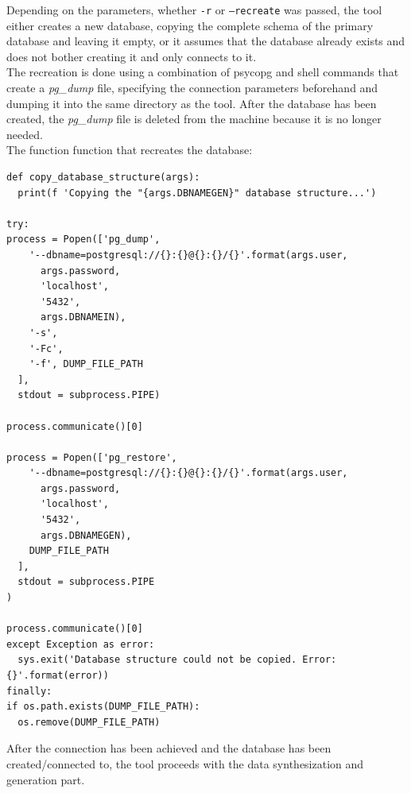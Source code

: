 Depending on the parameters, whether \texttt{-r} or \texttt{--recreate} was passed, the tool either creates a new database, copying the complete schema of the primary database and leaving it empty, or it assumes that the database already exists and does not bother creating it and only connects to it.\\
The recreation is done using a combination of psycopg and shell commands that create a \textit{pg\_dump} file, specifying the connection parameters beforehand and dumping it into the same directory as the tool. After the database has been created, the \textit{pg\_dump} file is deleted from the machine because it is no longer needed.\\
\newpage
The function function that recreates the database:
\begin{verbatim}
def copy_database_structure(args):
  print(f 'Copying the "{args.DBNAMEGEN}" database structure...')

try:
process = Popen(['pg_dump',
    '--dbname=postgresql://{}:{}@{}:{}/{}'.format(args.user,
      args.password,
      'localhost',
      '5432',
      args.DBNAMEIN),
    '-s',
    '-Fc',
    '-f', DUMP_FILE_PATH
  ],
  stdout = subprocess.PIPE)

process.communicate()[0]

process = Popen(['pg_restore',
    '--dbname=postgresql://{}:{}@{}:{}/{}'.format(args.user,
      args.password,
      'localhost',
      '5432',
      args.DBNAMEGEN),
    DUMP_FILE_PATH
  ],
  stdout = subprocess.PIPE
)

process.communicate()[0]
except Exception as error:
  sys.exit('Database structure could not be copied. Error: {}'.format(error))
finally:
if os.path.exists(DUMP_FILE_PATH):
  os.remove(DUMP_FILE_PATH)
\end{verbatim}
After the connection has been achieved and the database has been created/connected to, the tool proceeds with the data synthesization and generation part.\\
